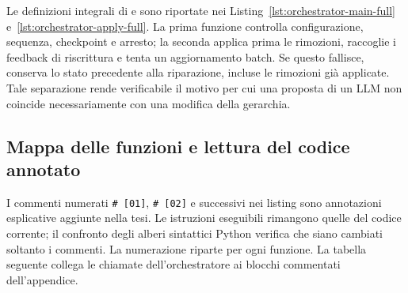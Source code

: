 Le definizioni integrali di
 e 
sono riportate nei Listing~\ref{lst:orchestrator-main-full}
e~\ref{lst:orchestrator-apply-full}. La prima funzione controlla
configurazione, sequenza, checkpoint e arresto; la seconda applica prima
le rimozioni, raccoglie i feedback di riscrittura e tenta un aggiornamento
batch. Se questo fallisce, conserva lo stato precedente alla riparazione,
incluse le rimozioni gi\`a applicate. Tale separazione rende verificabile
il motivo per cui una proposta di un LLM non coincide necessariamente
con una modifica della gerarchia.

\subsection{Mappa delle funzioni e lettura del codice annotato}
\label{sec:bottom-up-annotated-map}
I commenti numerati \texttt{\# [01]}, \texttt{\# [02]} e successivi nei
listing sono annotazioni esplicative aggiunte nella tesi. Le istruzioni
eseguibili rimangono quelle del codice corrente; il confronto degli alberi
sintattici Python verifica che siano cambiati soltanto i commenti.
La numerazione riparte per ogni funzione. La tabella seguente collega
le chiamate dell'orchestratore ai blocchi commentati dell'appendice.

